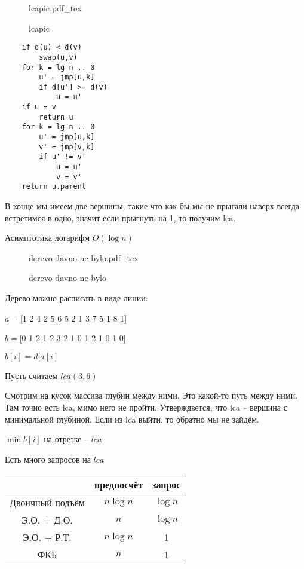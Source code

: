 \documentclass{book}
\theoremstyle{definition}
\newcommand{\incfig}[1]{%
    \def\svgwidth{\columnwidth}
    {#1.pdf_tex}
}
\begin{document}
\begin{figure}[!ht]
    \centering
    \incfig{lcapic}
    \caption{lcapic}
    \label{fig:lcapic}
\end{figure}

\begin{lstlisting}
    if d(u) < d(v)
        swap(u,v)
    for k = lg n .. 0
        u' = jmp[u,k]
        if d[u'] >= d(v)
            u = u'
    if u = v
        return u
    for k = lg n .. 0
        u' = jmp[u,k]
        v' = jmp[v,k]
        if u' != v'
            u = u'
            v = v'
    return u.parent
\end{lstlisting}

В конце мы имеем две вершины, такие что как бы мы не прыгали наверх всегда встретимся в одно, значит если прыгнуть на 1, то получим lca.

Асимптотика логарифм $O(\log n)$

\begin{figure}[!ht]
    \centering
    \incfig{derevo-davno-ne-bylo}
    \caption{derevo-davno-ne-bylo}
    \label{fig:derevo-davno-ne-bylo}
\end{figure}

Дерево можно расписать в виде линии:

$a = $[1 2 4 2 5 6 5 2 1 3 7 5 1 8 1]

$b = $[0 1 2 1 2 3 2 1 0 1 2 1 0 1 0]

$b[i] = d[a[i]$ 

Пусть считаем $lca(3,6)$

Смотрим на кусок массива глубин между ними. Это какой-то путь между ними. Там точно есть lca, мимо него не пройти. Утверждвется, что lca -- вершина с минимальной глубиной. Если из lca выйти, то обратно мы не зайдём.

$\min b[i]$ на отрезке --  $lca$

\begin{problem}
    Есть много запросов на $lca$

\end{problem}

    \begin{tabular}{c|c|c}
        &предпосчёт & запрос\\\hline
        Двоичный подъём & $n\log n$ & $\log n$\\
        Э.О. + Д.О. & $n$ &  $\log n$\\
        Э.О. + Р.Т. & $n\log n$ & 1\\
        ФКБ & $n$ & 1\\
    \end{tabular}
\end{document}
